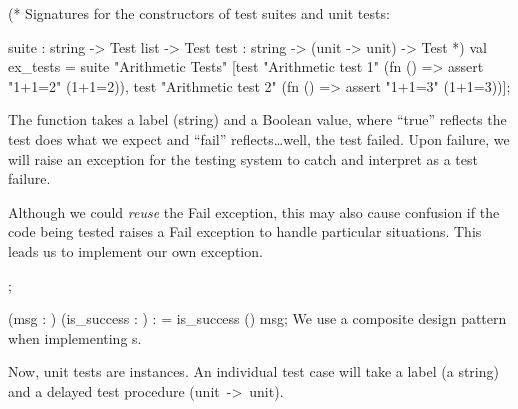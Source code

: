 \begin{sml}
(* Signatures for the constructors of test suites and unit tests:
  
  suite : string -> Test list -> Test
  test : string -> (unit -> unit) -> Test *)
val ex_tests
= suite "Arithmetic Tests"
        [test "Arithmetic test 1" (fn () => assert "1+1=2" (1+1=2)),
         test "Arithmetic test 2" (fn () => assert "1+1=3" (1+1=3))];
\end{sml}

The {\Tt{}\nwendquote} function takes a label (string) and a Boolean value,
where ``true'' reflects the test does what we expect and ``fail''
reflects\dots well, the test failed. Upon failure, we will raise an
exception for the testing system to catch and interpret as a test failure.

Although we could \emph{reuse} the {\Tt{}Fail\nwendquote} exception, this may also
cause confusion if the code being tested raises a {\Tt{}Fail\nwendquote} exception to
handle particular situations. This leads us to implement our own
{\Tt{}\nwendquote} exception. 

\nwenddocs{}\endmoddef\nwstartdeflinemarkup{}\nwenddeflinemarkup
{}   ;

  (msg : ) (is_success : ) :  =
     is_success  ()    msg;
\eatline
{}\nwendcode{}\nwdocspar
We use a composite design pattern when implementing {\Tt{}\nwendquote}s. 

Now, unit tests are {\Tt{}\nwendquote} instances. An individual test case will
take a label (a {\Tt{}string\nwendquote}) and a delayed test procedure ({\Tt{}unit\ ->\ unit\nwendquote}).

